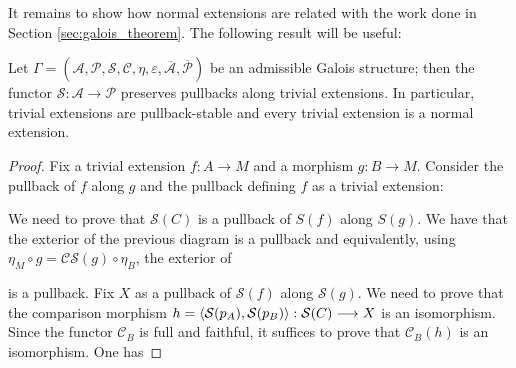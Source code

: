 It remains to show how normal extensions are related with the work done in Section \ref{sec:galois_theorem}. The following result will be useful:
\begin{proposition}
\label{prop:PullbackTrivialExtensions}
    Let $\Gamma = (\mathcal{A}, \mathcal{P}, \mathcal{S}, \mathcal{C}, \eta, \varepsilon, \overline{\mathcal{A}}, \overline{\mathcal{P}})$ be an admissible Galois structure; then the functor $\mathcal{S}:\mathcal{A}\to \mathcal{P}$ preserves pullbacks along trivial extensions. In particular, trivial extensions are pullback-stable and every trivial extension is a normal extension.
    \begin{proof}
        Fix a trivial extension $f:A\to M$ and a morphism $g:B\to M$. Consider the pullback of $f$ along $g$ and the pullback defining $f$ as a trivial extension:
        \begin{center}
        \end{center}
        We need to prove that $\mathcal{S}(C)$ is a pullback of $S(f)$ along $S(g)$. We have that the exterior of the previous diagram is a pullback and equivalently, using $\eta_M\circ g = \mathcal{C}\mathcal{S}(g)\circ \eta_B$, the exterior of
        \begin{center}
        \end{center}
        is a pullback. Fix $X$ as a pullback of $\mathcal{S}(f)$ along $\mathcal{S}(g)$. We need to prove that the comparison morphism $h=\langle{\mathcal{S}(p_A)},{\mathcal{S}(p_B)}\rangle:\mathcal{S}(C)\longrightarrow X$ is an isomorphism. Since the functor $\mathcal{C}_B$ is full and faithful, it suffices to prove that $\mathcal{C}_B(h)$ is an isomorphism. One has

\end{proof}
\end{proposition}
